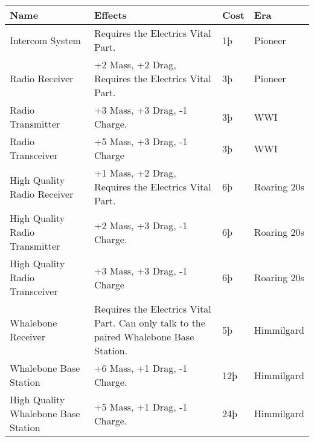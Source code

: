 \documentclass{article}
\begin{document}
\begin{tabular}{|l|l|l|l|}
  \hline
  Name                                & Effects                                              & Cost        & Era     \\\hline
  Intercom System                     & Requires the Electrics Vital Part.                   & 1þ          & Pioneer \\\hline
  Radio Receiver                      & +2 Mass, +2 Drag, Requires the Electrics Vital Part. &
  3þ                                  & Pioneer                                                                      \\\hline
  Radio Transmitter                   & +3 Mass, +3 Drag, -1 Charge.                         & 3þ          & WWI     \\\hline
  Radio Transceiver                   & +5 Mass, +3 Drag, -1 Charge                          & 3þ          & WWI     \\\hline
  High Quality Radio Receiver         & +1 Mass, +2 Drag, Requires the Electrics
  Vital Part.                         & 6þ                                                   & Roaring 20s           \\\hline
  High Quality Radio Transmitter      & +2 Mass, +3 Drag, -1 Charge.                         & 6þ          &
  Roaring 20s                                                                                                        \\\hline
  High Quality Radio Transceiver      & +3 Mass, +3 Drag, -1 Charge                          & 6þ          &
  Roaring 20s                                                                                                        \\\hline
  Whalebone Receiver                  & Requires the Electrics Vital Part. Can only talk to
  the paired Whalebone Base Station.  & 5þ                                                   & Himmilgard            \\\hline
  Whalebone Base Station              & +6 Mass, +1 Drag, -1 Charge.                         & 12þ         &
  Himmilgard                                                                                                         \\\hline
  High Quality Whalebone Base Station & +5 Mass, +1 Drag, -1 Charge.                         & 24þ
                                      & Himmilgard                                                                   \\\hline
\end{tabular}
\end{document}
